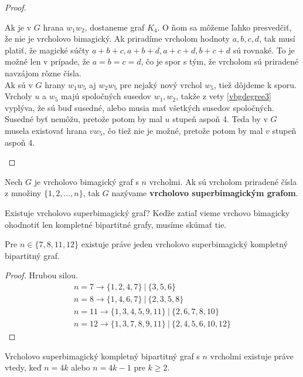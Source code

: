 \begin{proof}
\begin{enumerate}
Ak je v $G$ hrana $w_1 w_2$, dostaneme graf $K_4$. O ňom sa môžeme ľahko presvedčiť, že nie je vrcholovo bimagický. Ak priradíme vrcholom hodnoty $a,b,c,d$, tak musí platiť, že magické súčty $a+b+c, a+b+d, a+c+d, b+c+d$ sú rovnaké. To je možné len v prípade, že $a = b = c = d$, čo je spor s tým, že vrcholom sú priradené navzájom rôzne čísla. \\

Ak sú v $G$ hrany $w_1 w_5$ aj $w_2 w_5$ pre nejaký nový vrchol $w_5$, tiež dôjdeme k sporu. Vrcholy $u$ a $w_5$ majú spoločných susedov $w_1, w_2$, takže z vety \ref{vbgdegree3} vyplýva, že sú buď susedné, alebo musia mať všetkých susedov spoločných. Susedné byť nemôžu, pretože potom by mal $u$ stupeň aspoň 4. Teda by v $G$ musela existovať hrana $v w_5$, čo tiež nie je možné, pretože potom by mal $v$ stupeň aspoň 4.
\end{enumerate}

\end{proof}

\begin{definition} Nech $G$ je vrcholovo bimagický graf s $n$ vrcholmi. Ak sú vrcholom priradené čísla z množiny $\{1, 2, ... , n\}$, tak $G$ nazývame \textbf{vrcholovo superbimagickým grafom}.
\end{definition} 

Existuje vrcholovo superbimagický graf? Keďže zatiaľ vieme vrchovo bimagicky ohodnotiť len kompletné bipartitné grafy, musíme skúmať tie. \\

\begin{theorem}
\label{vsbg1}
Pre $n \in \{7, 8, 11, 12\}$  existuje práve jeden vrcholovo superbimagický kompletný bipartitný graf.
\end{theorem}

\begin{proof} Hrubou silou.
\begin{gather*}
n = 7 \rightarrow \{1, 2, 4, 7\} ~|~ \{3, 5, 6\} \\
n = 8 \rightarrow \{1, 4, 6, 7\} ~|~ \{2, 3, 5, 8\} \\
n = 11 \rightarrow \{1, 3, 4, 5, 9, 11\} ~|~ \{2, 6, 7, 8, 10\} \\
n = 12 \rightarrow \{1, 3, 7, 8, 9, 11\} ~|~ \{2, 4, 5, 6, 10, 12\}
\end{gather*}
\end{proof}

\begin{theorem}
\label{vsbgkij}
Vrcholovo superbimagický kompletný bipartitný graf s $n$ vrcholmi existuje práve vtedy, keď $n = 4k$ alebo $n = 4k-1$ pre $k \geq 2$.
\end{theorem}

